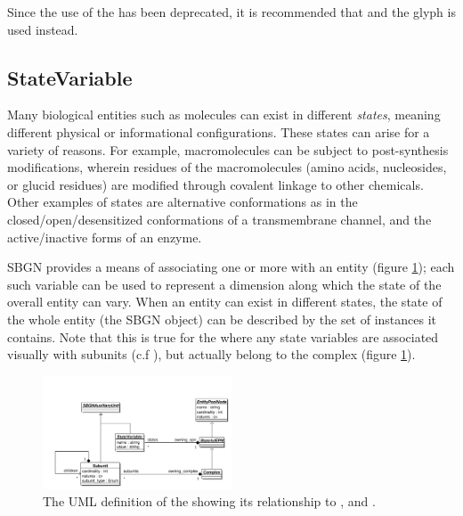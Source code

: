 Since the use of the  has been deprecated,
it is recommended that  and the
 glyph is used instead.

\subsection{StateVariable}
\label{defn:StateVariable}

Many biological entities such as molecules can exist in different
\emph{states}, meaning different physical or informational
configurations.  These states can arise for a variety of reasons.  For
example, macromolecules can be subject to post-synthesis
modifications, wherein residues of the macromolecules (amino acids,
nucleosides, or glucid residues) are modified through covalent linkage
to other chemicals.  Other examples of states are alternative
conformations as in the closed/open/desensitized conformations of a
transmembrane channel, and the active/inactive forms of an enzyme.

SBGN provides a means of associating one or more
 with an entity (figure
\ref{fig:statevariableviewuml}); each such variable can be used to
represent a dimension along which the state of the overall entity can
vary.  When an entity can exist in different states, the state of the
whole entity (\ie the SBGN object) can be described by the set of
 instances it contains. Note that this is
true for the  where any state variables are
associated visually with subunits (c.f ), but
actually belong to the complex (figure
\ref{fig:statevariableviewuml}).

\begin{figure}[htb]
  \centering
  \includegraphics[width = 0.5\textwidth]{images/statevariableviewuml}
  \caption{The UML definition of the  showing
    its relationship to , 
    and .}
  \label{fig:statevariableviewuml}
\end{figure}

